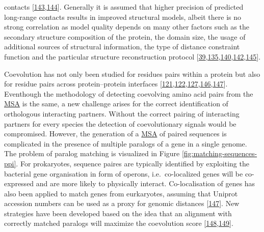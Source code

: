 \documentclass[11pt,a4paper,twoside]{book}
\theoremstyle{definition}
\theoremstyle{definition}
\theoremstyle{remark}
\begin{document}
contacts
{[}\protect\hyperlink{ref-Wang2016}{143},\protect\hyperlink{ref-Adhikari2015a}{144}{]}.
Generally it is assumed that higher precision of predicted long-range
contacts results in improved structural models, albeit there is no
strong correlation as model quality depends on many other factors such
as the secondary structure composition of the protein, the domain size,
the usage of additional sources of structural information, the type of
distance constraint function and the particular structure reconstruction
protocol
{[}\protect\hyperlink{ref-Marks2011}{39},\protect\hyperlink{ref-Kosciolek2014}{135},\protect\hyperlink{ref-Adhikari2017}{140},\protect\hyperlink{ref-Zhang2003}{142},\protect\hyperlink{ref-DeOliveira2016}{145}{]}.

Coevolution has not only been studied for residues pairs within a
protein but also for residue pairs across protein--protein interfaces
{[}\protect\hyperlink{ref-Ovchinnikov2014a}{121},\protect\hyperlink{ref-Hopf2014}{122},\protect\hyperlink{ref-Ovchinnikov2015a}{127},\protect\hyperlink{ref-Rodriguez-Rivas2016}{146},\protect\hyperlink{ref-Feinauer2016a}{147}{]}.
Eventhough the methodology of detecting coevolving amino acid pairs from
the \protect\hyperlink{abbrev}{MSA} is the same, a new challenge arises
for the correct identification of orthologous interacting partners.
Without the correct pairing of interacting partners for every species
the detection of coevolutionary signals would be compromised. However,
the generation of a \protect\hyperlink{abbrev}{MSA} of paired sequences
is complicated in the presence of multiple paralogs of a gene in a
single genome. The problem of paralog matching is visualized in Figure
\ref{fig:matching-sequences-ppi}. For prokaryotes, sequence paires are
typically identified by exploiting the bacterial gene organisation in
form of operons, i.e.~co-localized genes will be co-expressed and are
more likely to physically interact. Co-localisation of genes has also
been applied to match genes from eurkaryotes, assuming that Uniprot
accession numbers can be used as a proxy for genomic distances
{[}\protect\hyperlink{ref-Feinauer2016a}{147}{]}. New strategies have
been developed based on the idea that an alignment with correctly
matched paralogs will maximize the coevolution score
{[}\protect\hyperlink{ref-Gueudre2016}{148},\protect\hyperlink{ref-Bitbol2016}{149}{]}.
\end{document}
